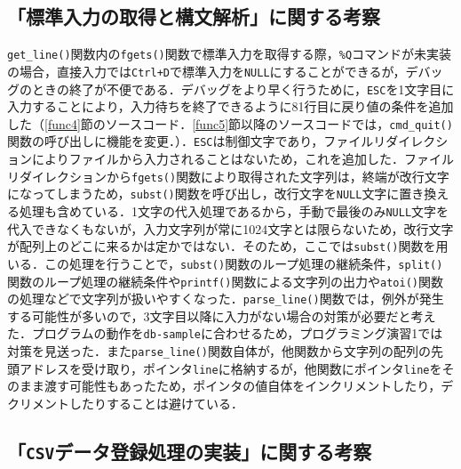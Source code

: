 \subsection{「標準入力の取得と構文解析」に関する考察}

\verb|get_line()|関数内の\verb|fgets()|関数で標準入力を取得する際，\verb|%Q|コマンドが未実装の場合，直接入力では\verb|Ctrl+D|で標準入力を\verb|NULL|にすることができるが，デバッグのときの終了が不便である．デバッグをより早く行うために，\verb|ESC|を1文字目に入力することにより，入力待ちを終了できるように81行目に戻り値の条件を追加した（\ref{func4}節のソースコード．\ref{func5}節以降のソースコードでは，\verb|cmd_quit()|関数の呼び出しに機能を変更．）．\verb|ESC|は制御文字であり，ファイルリダイレクションによりファイルから入力されることはないため，これを追加した\cite{www:label2}．ファイルリダイレクションから\verb|fgets()|関数により取得された文字列は，終端が改行文字になってしまうため，\verb|subst()|関数を呼び出し，改行文字を\verb|NULL|文字に置き換える処理も含めている．1文字の代入処理であるから，手動で最後のみ\verb|NULL|文字を代入できなくもないが，入力文字列が常に1024文字とは限らないため，改行文字が配列上のどこに来るかは定かではない．そのため，ここでは\verb|subst()|関数を用いる．この処理を行うことで，\verb|subst()|関数のループ処理の継続条件，\verb|split()|関数のループ処理の継続条件や\verb|printf()|関数による文字列の出力や\verb|atoi()|関数の処理などで文字列が扱いやすくなった．\verb|parse_line()|関数では，例外が発生する可能性が多いので，3文字目以降に入力がない場合の対策が必要だと考えた．プログラムの動作を\verb|db-sample|に合わせるため，プログラミング演習1では対策を見送った．また\verb|parse_line()|関数自体が，他関数から文字列の配列の先頭アドレスを受け取り，ポインタ\verb|line|に格納するが，他関数にポインタ\verb|line|をそのまま渡す可能性もあったため，ポインタの値自体をインクリメントしたり，デクリメントしたりすることは避けている．

\subsection{「\texttt{CSV}データ登録処理の実装」に関する考察}

